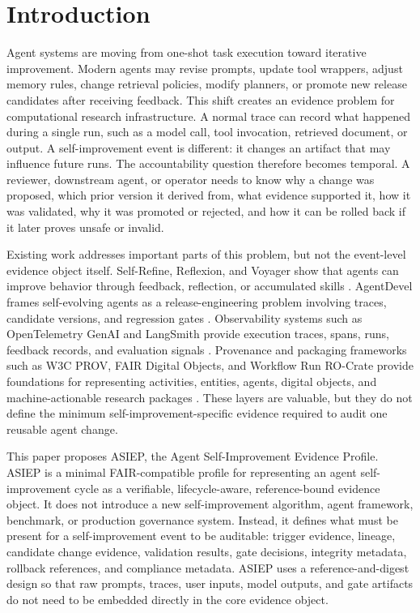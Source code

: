 \section{Introduction}

Agent systems are moving from one-shot task execution toward iterative improvement. Modern agents may revise prompts, update tool wrappers, adjust memory rules, change retrieval policies, modify planners, or promote new release candidates after receiving feedback. This shift creates an evidence problem for computational research infrastructure. A normal trace can record what happened during a single run, such as a model call, tool invocation, retrieved document, or output. A self-improvement event is different: it changes an artifact that may influence future runs. The accountability question therefore becomes temporal. A reviewer, downstream agent, or operator needs to know why a change was proposed, which prior version it derived from, what evidence supported it, how it was validated, why it was promoted or rejected, and how it can be rolled back if it later proves unsafe or invalid.

Existing work addresses important parts of this problem, but not the event-level evidence object itself. Self-Refine, Reflexion, and Voyager show that agents can improve behavior through feedback, reflection, or accumulated skills \cite{self_refine_2023,reflexion_2023,voyager_2023}. AgentDevel frames self-evolving agents as a release-engineering problem involving traces, candidate versions, and regression gates \cite{agentdevel_2026}. Observability systems such as OpenTelemetry GenAI and LangSmith provide execution traces, spans, runs, feedback records, and evaluation signals \cite{otel_genai_semconv,langsmith_observability_concepts}. Provenance and packaging frameworks such as W3C PROV, FAIR Digital Objects, and Workflow Run RO-Crate provide foundations for representing activities, entities, agents, digital objects, and machine-actionable research packages \cite{w3c_prov_dm,fdo_architecture_spec,workflow_run_rocrate}. These layers are valuable, but they do not define the minimum self-improvement-specific evidence required to audit one reusable agent change.

This paper proposes ASIEP, the Agent Self-Improvement Evidence Profile. ASIEP is a minimal FAIR-compatible profile for representing an agent self-improvement cycle as a verifiable, lifecycle-aware, reference-bound evidence object. It does not introduce a new self-improvement algorithm, agent framework, benchmark, or production governance system. Instead, it defines what must be present for a self-improvement event to be auditable: trigger evidence, lineage, candidate change evidence, validation results, gate decisions, integrity metadata, rollback references, and compliance metadata. ASIEP uses a reference-and-digest design so that raw prompts, traces, user inputs, model outputs, and gate artifacts do not need to be embedded directly in the core evidence object.

